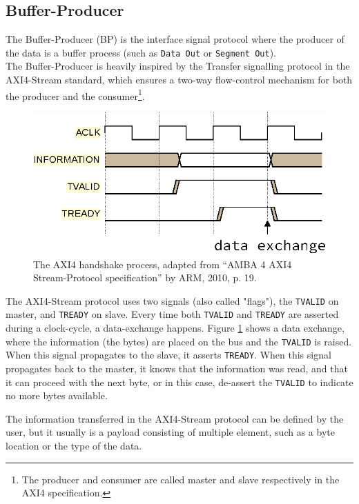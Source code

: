 \subsection{Buffer-Producer}
The Buffer-Producer (BP) is the interface signal protocol where the producer of
the data is a buffer process (such as \texttt{Data Out} or \texttt{Segment
Out}).\\
The Buffer-Producer is heavily inspired by the Transfer signalling protocol in
the AXI4-Stream standard, which ensures a two-way flow-control mechanism for both
the producer and the consumer\footnote{The producer and consumer are called
master and slave respectively in the AXI4 specification.}\cite{arm_axi4}.

\begin{figure}[h]
\centering
\includegraphics[scale=0.8]{implementation/axi4_handshake.eps}
\caption{The AXI4 handshake process, adapted from “AMBA 4 AXI4 Stream-Protocol
specification” by ARM, 2010, p. 19. }
\label{fig:axi4_handshake}
\end{figure}

The AXI4-Stream protocol uses two signals (also called "flags"), the \texttt{TVALID}
on master, and \texttt{TREADY} on slave. Every time both \texttt{TVALID} and
\texttt{TREADY} are asserted during a clock-cycle, a data-exchange happens.
Figure \ref{fig:axi4_handshake} shows a data exchange, where the information
(the bytes) are placed on the bus and the \texttt{TVALID} is raised. When this
signal propagates to the slave, it asserts \texttt{TREADY}. When this signal
propagates back to the master, it knows that the information was read, and that
it can proceed with the next byte, or in this case, de-assert the
\texttt{TVALID} to indicate no more bytes available\cite{arm_axi4}.

The information transferred in the AXI4-Stream protocol can be defined by the user,
but it usually is a payload consisting of multiple element, such as a byte
location or the type of the data.
\\

